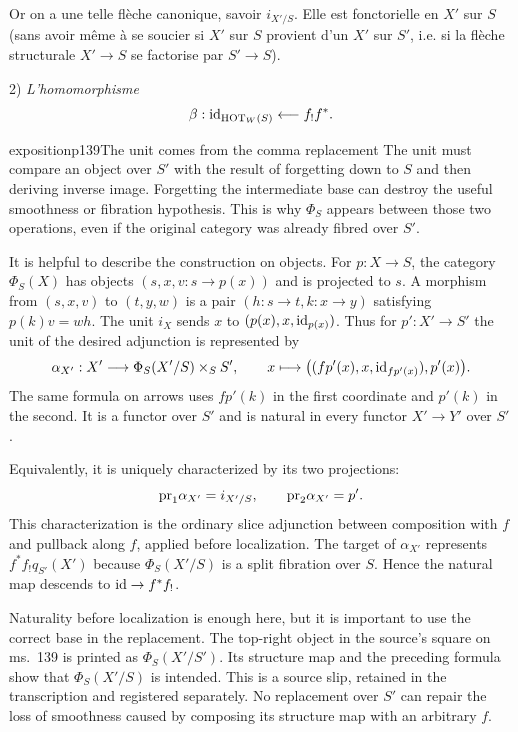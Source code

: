 Or on a une telle flèche canonique, savoir $i_{X'/S}$. Elle est fonctorielle en $X'$ sur $S$ (sans avoir même à se soucier si $X'$ sur $S$ provient d'un $X'$ sur $S'$, i.e. si la flèche structurale $X'\longrightarrow S$ se factorise par $S'\longrightarrow S$).

\leavevmode{}2) \textit{L'homomorphisme}
\[
\beta : \mathrm{id}_{\mathrm{HOT}_W(S)} \longleftarrow f_!f^*.
\]

\begin{dcomment}{exposition}{p139}{The unit comes from the comma replacement}
The unit must compare an object over $S'$ with the result of forgetting down to $S$ and then deriving inverse image. Forgetting the intermediate base can destroy the useful smoothness or fibration hypothesis. This is why $\Phi_S$ appears between those two operations, even if the original category was already fibred over $S'$.

It is helpful to describe the construction on objects. For $p:X\to S$, the category $\Phi_S(X)$ has objects $(s,x,v:s\to p(x))$ and is projected to $s$. A morphism from $(s,x,v)$ to $(t,y,w)$ is a pair $(h:s\to t,k:x\to y)$ satisfying $p(k)v=wh$. The unit $i_X$ sends $x$ to $(p(x),x,\mathrm{id}_{p(x)})$. Thus for $p':X'\to S'$ the unit of the desired adjunction is represented by
\[
 \alpha_{X'}:X'\longrightarrow\Phi_S(X'/S)\times_S S',
 \qquad x\longmapsto
 \bigl((f p'(x),x,\mathrm{id}_{f p'(x)}),p'(x)\bigr).
\]
The same formula on arrows uses $f p'(k)$ in the first coordinate and $p'(k)$ in the second. It is a functor over $S'$ and is natural in every functor $X'\to Y'$ over $S'$.

Equivalently, it is uniquely characterized by its two projections:
\[
 \mathrm{pr}_1\alpha_{X'}=i_{X'/S},
 \qquad \mathrm{pr}_2\alpha_{X'}=p'.
\]
This characterization is the ordinary slice adjunction between composition with $f$ and pullback along $f$, applied before localization. The target of $\alpha_{X'}$ represents $f^*f_!q_{S'}(X')$ because $\Phi_S(X'/S)$ is a split fibration over $S$. Hence the natural map descends to $\mathrm{id}\to f^*f_!$.

Naturality before localization is enough here, but it is important to use the correct base in the replacement. The top-right object in the source's square on ms.~139 is printed as $\Phi_S(X'/S')$. Its structure map and the preceding formula show that $\Phi_S(X'/S)$ is intended. This is a source slip, retained in the transcription and registered separately. No replacement over $S'$ can repair the loss of smoothness caused by composing its structure map with an arbitrary $f$.
\end{dcomment}


